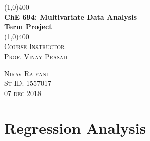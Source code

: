 \documentclass[9pt]{article}
\begin{document}
	\begin{titlepage}
		\begin{center}
			\line(1,0){400}\\
				[0.25in]
				\huge{\bfseries ChE 694: Multivariate Data Analysis\\Term Project }\\
			\line(1,0){400}\\
			[3cm]
			\textsc{\Large \underline{Course Instructor}\\ Prof. Vinay Prasad}	\\
			
		\end{center}
		
		\begin{figure}
			\centering 
		\end{figure}
		
		
		
		
		
		\vfill
		\begin{center}
			\textsc{\Large Nirav Raiyani\\ St ID: 1557017\\ 07 dec 2018}	
		\end{center}
\end{titlepage}
\tableofcontents
\listoffigures

\newpage
	
	
	\section{Regression Analysis}
\end{document}
